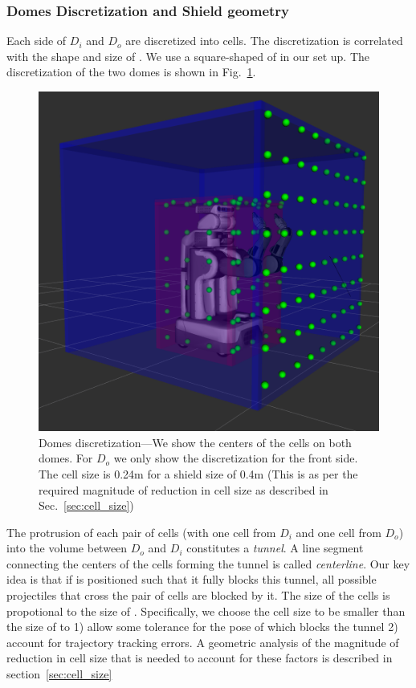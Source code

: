 \documentclass[a4paper]{report}
\begin{document}
\subsubsection{Domes Discretization and Shield geometry}
Each side of $D_i$ and $D_o$ are discretized into cells. The discretization is correlated with the shape and size of \calS. We use a square-shaped \calS of in our set up. The discretization of the two domes is shown in Fig.~\ref{fig:domes_disc}.
%

\begin{figure}[ht]
\centering
\includegraphics[width=0.8\columnwidth]{domes_disc}
\caption{Domes discretization---We show the centers of the cells on both domes. For $D_o$ we only show the discretization for the front side. The cell size is 0.24m for a shield size of 0.4m (This is as per the required magnitude of reduction in cell size as described in Sec.~\ref{sec:cell_size})}
\label{fig:domes_disc}
\end{figure}

The protrusion of each pair of cells (with one cell from $D_i$ and one cell from $D_o$) into the volume between $D_o$ and $D_i$ constitutes a \emph{tunnel}. A line segment connecting the centers of the cells forming the tunnel is called \emph{centerline}. Our key idea is that if \calS is positioned such that it fully blocks this tunnel, all possible projectiles that cross the pair of cells are blocked by it.
%
The size of the cells is propotional to the size of \calS. Specifically, we choose the cell size to be smaller than the size of \calS to 1) allow some tolerance for the pose of \calS which blocks the tunnel 2) account for trajectory tracking errors.
%
A geometric analysis of the magnitude of reduction in cell size that is needed to account for these factors is described in section~\ref{sec:cell_size}
\end{document}
